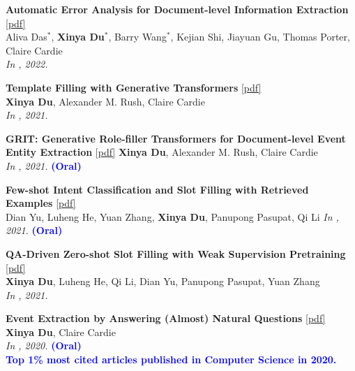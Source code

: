 \begin{enumerate}[{[}1{]},leftmargin=*]
\item 
{\bf Automatic Error Analysis for Document-level Information Extraction} 
\href{https://aclanthology.org/2022.acl-long.274.pdf}{{[pdf]}} \\
Aliva Das$^{*}$, {\bf Xinya Du}$^{*}$, Barry Wang$^{*}$, Kejian Shi, Jiayuan Gu, Thomas Porter, Claire Cardie \\
{\it In \ACL, 2022.} \\



\item
{\bf Template Filling with Generative Transformers} 
\href{https://aclanthology.org/2021.naacl-main.70.pdf}{{[pdf]}} \\
{{\bf Xinya Du}, Alexander M. Rush, Claire Cardie} \\
{\it In \NAACL, 2021.} \\

\item
{\bf GRIT: Generative Role-ﬁller Transformers for Document-level Event Entity Extraction}
\href{https://aclanthology.org/2021.eacl-main.52.pdf}{{[pdf]}} 
{\textbf{Xinya Du}, Alexander M. Rush, Claire Cardie} \\
{\it In \EACL, 2021.} {\textcolor{blue}{\textbf{(Oral)}}} \\

\item
{\bf Few-shot Intent Classification and Slot Filling with Retrieved Examples}
\href{https://aclanthology.org/2021.naacl-main.59.pdf}{{[pdf]}} \\
{Dian Yu, Luheng He, Yuan Zhang, \textbf{Xinya Du}, Panupong Pasupat, Qi Li} 
{\it In \NAACL, 2021.} {\textcolor{blue}{\textbf{(Oral)}}} \\ 

\item
{\bf QA-Driven Zero-shot Slot Filling with Weak Supervision Pretraining}
\href{https://aclanthology.org/2021.acl-short.83.pdf}{{[pdf]}} \\
{{\bf Xinya Du}, Luheng He, Qi Li, Dian Yu, Panupong Pasupat, Yuan Zhang} \\
{\it In \ACL, 2021.}\\

\item
{\bf Event Extraction by Answering (Almost) Natural Questions}
\href{https://aclanthology.org/2020.emnlp-main.49.pdf}{{[pdf]}} \\
{\textbf{Xinya Du}, Claire Cardie} \\
{\it In \EMNLP, 2020.} {\textcolor{blue}{\textbf{(Oral)}}} \\
{\textcolor{blue}{\textbf{Top 1\% most cited articles published in Computer Science in 2020.}}} \\


\end{enumerate}
